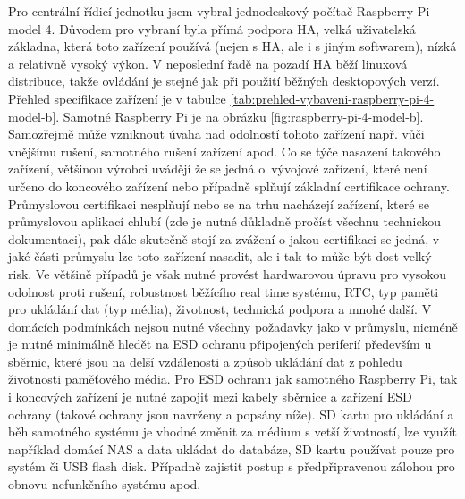 Pro centrální řídicí jednotku jsem vybral jednodeskový počítač Raspberry Pi model 4. Důvodem pro vybraní byla přímá podpora HA, velká uživatelská základna, která toto zařízení používá (nejen s HA, ale i s jiným softwarem), nízká a relativně vysoký výkon. V neposlední řadě na pozadí HA běží linuxová distribuce, takže ovládání je stejné jak při použití běžných desktopových verzí. Přehled specifikace zařízení je v tabulce \ref{tab:prehled-vybaveni-raspberry-pi-4-model-b}. Samotné Raspberry Pi je na obrázku \ref{fig:raspberry-pi-4-model-b}. Samozřejmě může vzniknout úvaha nad odolností tohoto zařízení např. vůči vnějšímu rušení, samotného rušení zařízení apod. Co se týče nasazení takového zařízení, většinou výrobci uvádějí že se jedná o~vývojové zařízení, které není určeno do koncového zařízení nebo případně splňují  základní certifikace ochrany. Průmyslovou certifikaci nesplňují nebo se na trhu nacházejí zařízení, které se průmyslovou aplikací chlubí (zde je nutné důkladně pročíst všechnu technickou dokumentaci), pak dále skutečně stojí za zvážení o jakou certifikaci se jedná, v jaké části průmyslu lze toto zařízení nasadit, ale i tak to může být dost velký risk. Ve většině případů je však nutné provést hardwarovou úpravu pro vysokou odolnost proti rušení, robustnost běžícího real time systému, RTC, typ paměti pro ukládání dat (typ média), životnost, technická podpora a mnohé další. V domácích podmínkách nejsou nutné všechny požadavky jako v průmyslu, nicméně je nutné minimálně hledět na ESD ochranu připojených periferií především u sběrnic, které jsou na delší vzdálenosti a způsob ukládání dat z pohledu životnosti paměťového média. Pro ESD ochranu jak samotného Raspberry Pi, tak i koncových zařízení je nutné zapojit mezi kabely sběrnice a zařízení ESD ochrany (takové ochrany jsou navrženy a popsány níže). SD kartu pro ukládání a běh samotného systému je vhodné změnit za médium s vetší životností, lze využít například domácí NAS a data ukládat do databáze, SD kartu používat pouze pro systém či USB flash disk. Případně zajistit postup s předpřipravenou zálohou pro obnovu nefunkčního systému apod. 

